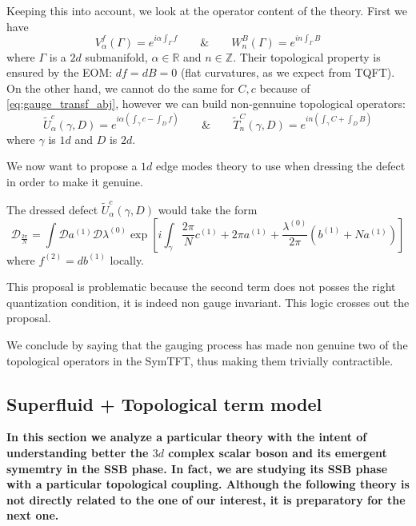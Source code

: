 \documentclass[aps,preprint,nofootinbib,preprintnumbers,eqsecnum,superscriptaddress]{revtex4}
\numberwithin{equation}{section}
\begin{document}
Keeping this into account, we look at the operator content of the theory. First we have
\begin{equation}
    V^f_\alpha (\Gamma) = e^{i\alpha \int_\Gamma f} \qquad \& \qquad W^B_n (\Gamma) = e^{in\int_\Gamma B}
\end{equation}
where $\Gamma$ is a $2d$ submanifold, $\alpha \in \mathbb{R}$ and $n \in \mathbb{Z}$. Their topological property is ensured by the EOM: $df=dB=0$ (flat curvatures, as we expect from TQFT).
On the other hand, we cannot do the same for $C, c$ because of \ref{eq:gauge_transf_abj}, however we can build non-gennuine topological operators:
\begin{equation}
    \tilde{U}^c_\alpha (\gamma, D) = e^{i\alpha( \int_\gamma c -\int_D f)} \qquad \& \qquad \tilde{T}^C_n (\gamma, D) = e^{in(\int_\gamma C + \int_D B)}
\end{equation}
where $\gamma$ is $1d$ and $D$ is $2d$.


\begin{tcolorbox}[colback=blue!5!white,colframe=blue!75!black,title={Proposal}]
    We now want to propose a $1d$ edge modes theory to use when dressing the defect in order to make it genuine. 

    The dressed defect $\tilde{U}^c_\alpha (\gamma, D)$ would take the form
    \begin{equation}
        \mathcal{D}_\frac{2\pi}{N} = \int \mathcal{D} a^{(1)} \mathcal{D} \lambda^{(0)}\exp \left[ i  \int_{\gamma} \frac{2\pi}{N} c^{(1)} +  2\pi a^{(1)} + \frac{\lambda^{(0)}}{2\pi}\left(b^{(1)} +  Na^{(1)} \right) \right]
    \end{equation}
    where $f^{(2)} = db^{(1)}$ locally.

    This proposal is problematic because the second term does not posses the right quantization condition, it is indeed non gauge invariant. This logic crosses out the proposal.
\end{tcolorbox}

We conclude by saying that the gauging process has made non genuine two of the topological operators in the SymTFT, thus making them trivially contractible.



\subsection{Superfluid + Topological term model}
\label{sec:superfluid_topologicalterm}
{\bf In this section we analyze a particular theory with the intent of understanding better the $3d$ complex scalar boson and its emergent symemtry in the SSB phase. In fact, we are studying its SSB phase with a particular topological coupling. Although the following theory is not directly related to the one of our interest, it is preparatory for the next one.}
\end{document}
